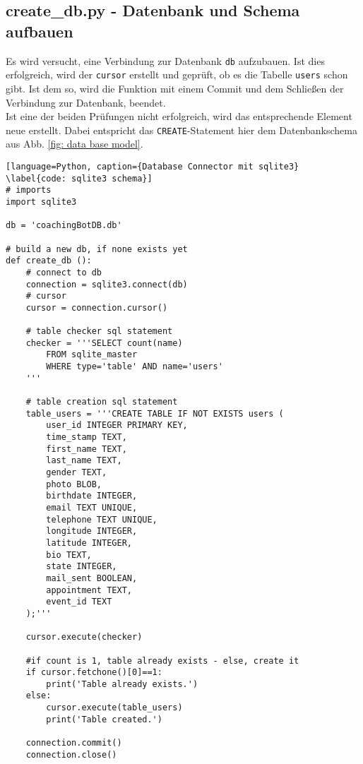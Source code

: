         \subsection{create\_db.py - Datenbank und Schema aufbauen}
            Es wird versucht, eine Verbindung zur Datenbank \verb|db| aufzubauen. Ist dies erfolgreich, wird der \verb|cursor| erstellt und geprüft, ob es die Tabelle \verb|users| schon gibt. Ist dem so, wird die Funktion mit einem Commit und dem Schließen der Verbindung zur Datenbank, beendet. \\
            Ist eine der beiden Prüfungen nicht erfolgreich, wird das entsprechende Element neue erstellt. Dabei entspricht das \verb|CREATE|-Statement hier dem Datenbankschema aus Abb. \ref*{fig: data base model}.
            \begin{lstlisting}[language=Python, caption={Database Connector mit sqlite3} \label{code: sqlite3 schema}]
# imports
import sqlite3

db = 'coachingBotDB.db'

# build a new db, if none exists yet
def create_db ():
    # connect to db
    connection = sqlite3.connect(db)
    # cursor
    cursor = connection.cursor()

    # table checker sql statement
    checker = '''SELECT count(name)
        FROM sqlite_master
        WHERE type='table' AND name='users'
    '''

    # table creation sql statement
    table_users = '''CREATE TABLE IF NOT EXISTS users (
        user_id INTEGER PRIMARY KEY,
        time_stamp TEXT,
        first_name TEXT,
        last_name TEXT,
        gender TEXT,
        photo BLOB,
        birthdate INTEGER,
        email TEXT UNIQUE,
        telephone TEXT UNIQUE,
        longitude INTEGER,
        latitude INTEGER,
        bio TEXT,
        state INTEGER,
        mail_sent BOOLEAN,
        appointment TEXT,
        event_id TEXT
    );'''

    cursor.execute(checker)

    #if count is 1, table already exists - else, create it
    if cursor.fetchone()[0]==1:
        print('Table already exists.')
    else:
        cursor.execute(table_users)
        print('Table created.')

    connection.commit()
    connection.close()
                \end{lstlisting}


